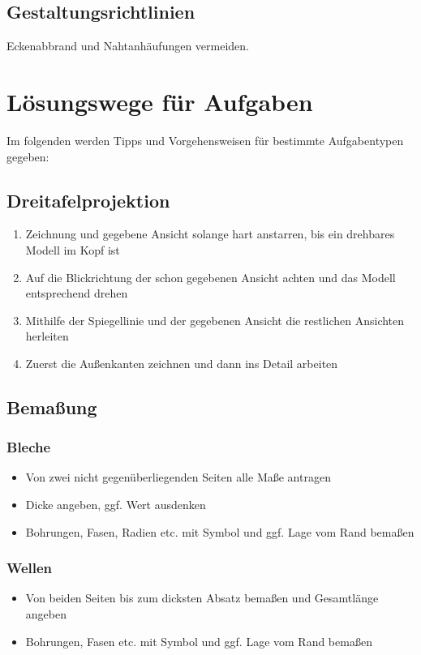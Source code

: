 \documentclass[a4paper,parskip=half*,DIV=7,fontsize=11pt]{scrartcl}
\begin{document}
\subsection{Gestaltungsrichtlinien}
Eckenabbrand und Nahtanhäufungen vermeiden.

\pagebreak
\section{Lösungswege für Aufgaben}
Im folgenden werden Tipps und Vorgehensweisen für bestimmte Aufgabentypen gegeben:
\subsection{Dreitafelprojektion}
\begin{enumerate}
	\item Zeichnung und gegebene Ansicht solange hart anstarren, bis ein drehbares Modell im Kopf ist
	\item Auf die Blickrichtung der schon gegebenen Ansicht achten und das Modell entsprechend drehen
	\item Mithilfe der Spiegellinie und der gegebenen Ansicht die restlichen Ansichten herleiten
	\item Zuerst die Außenkanten zeichnen und dann ins Detail arbeiten
\end{enumerate}

\subsection{Bemaßung}
\subsubsection{Bleche}
\begin{itemize}
	\item Von zwei nicht gegenüberliegenden Seiten alle Maße antragen
	\item Dicke angeben, ggf. Wert ausdenken
	\item Bohrungen, Fasen, Radien etc. mit Symbol und ggf. Lage vom Rand bemaßen
\end{itemize}

\subsubsection{Wellen}
\begin{itemize}
	\item Von beiden Seiten bis zum dicksten Absatz bemaßen und Gesamtlänge angeben
	\item Bohrungen, Fasen etc. mit Symbol und ggf. Lage vom Rand bemaßen
\end{itemize}
\end{document}
